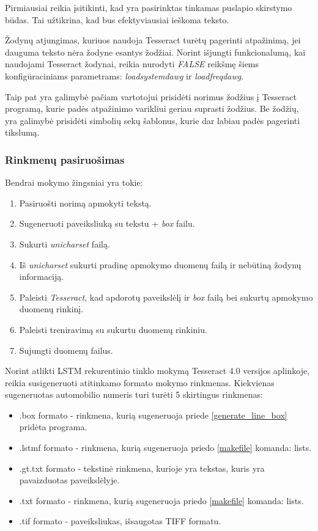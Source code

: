 \documentclass{VUMIFInfBakalaurinis}
\begin{document}
Pirmiausiai reikia įsitikinti, kad yra pasirinktas tinkamas puslapio skirstymo būdas. Tai užtikrina, kad bus efektyviausiai ieškoma teksto.

Žodynų atjungimas, kuriuos naudoja Tesseract turėtų pagerinti atpažinimą, jei dauguma teksto nėra žodyne esantys žodžiai.
Norint išjungti funkcionalumą, kai naudojami Tesseract žodynai, reikia nurodyti \textit{FALSE} reikšmę šiems konfigūraciniams parametrams:
\textit{load\textunderscore system\textunderscore dawg} ir \textit{load\textunderscore freq\textunderscore dawg}.

Taip pat yra galimybė pačiam vartotojui prisidėti norimus žodžius į Tesseract programą, kurie padės atpažinimo varikliui geriau suprasti žodžius.
Be žodžių, yra galimybė prisidėti simbolių sekų šablonus, kurie dar labiau padės pagerinti tikslumą.

\subsubsection{Rinkmenų pasiruošimas}
Bendrai mokymo žingsniai yra tokie:

\begin{enumerate}[itemsep=0.5pt]
  \item Pasiruošti norimą apmokyti tekstą.
  \item Sugeneruoti paveiksliuką su tekstu + \textit{box} failu.
  \item Sukurti \textit{unicharset} failą.
  \item Iš \textit{unicharset} sukurti pradinę apmokymo duomenų failą ir nebūtiną žodynų informaciją. 
  \item Paleisti \textit{Tesseract}, kad apdorotų paveikslėlį ir \textit{box} failą bei sukurtų apmokymo duomenų rinkinį.
  \item Paleisti treniravimą su sukurtu duomenų rinkiniu.
  \item Sujungti duomenų failus.
\end{enumerate}

Norint atlikti LSTM rekurentinio tinklo mokymą Tesseract 4.0 versijos aplinkoje, reikia susigeneruoti atitinkamo formato mokymo rinkmenas.
Kiekvienas sugeneruotas automobilio numeris turi turėti 5 skirtingus rinkmenas:
\begin{itemize}[itemsep=0.5pt]
  \item .box formato - rinkmena, kurią sugeneruoja priede \ref{generate_line_box} pridėta programa.
  \item .lstmf formato - rinkmena, kurią sugeneruoja priedo \ref{makefile} komanda: lists. 
  \item .gt.txt formato - tekstinė rinkmena, kurioje yra tekstas, kuris yra pavaizduotas paveikslėlyje.
  \item .txt formato - rinkmena, kurią sugeneruoja priedo \ref{makefile} komanda: lists. 
  \item .tif formato - paveiksliukas, išsaugotas TIFF formatu.
\end{itemize}
\end{document}
